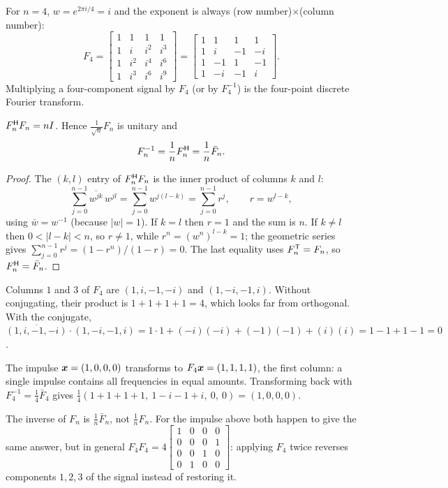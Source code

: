 For $n=4$, $w=e^{2\pi i/4}=i$ and the exponent is always (row number)$\times$(column number):
\[
  F_4=\begin{bmatrix}1&1&1&1\\1&i&i^2&i^3\\1&i^2&i^4&i^6\\1&i^3&i^6&i^9\end{bmatrix}
     =\begin{bmatrix}1&1&1&1\\1&i&-1&-i\\1&-1&1&-1\\1&-i&-1&i\end{bmatrix}.
\]
Multiplying a four-component signal by $F_4$ (or by $F_4^{-1}$) is the four-point discrete Fourier
transform.

\begin{theorem}\label{thm:u30-orth}
$F_n^{\mathsf{H}} F_n=nI$. Hence $\frac{1}{\sqrt n}F_n$ is unitary and
\[
  F_n^{-1}=\frac1n F_n^{\mathsf{H}}=\frac1n\bar F_n .
\]
\end{theorem}
\begin{proof}
The $(k,l)$ entry of $F_n^{\mathsf{H}} F_n$ is the inner product of columns $k$ and $l$:
\[
  \sum_{j=0}^{n-1}\overline{w^{jk}}\,w^{jl}=\sum_{j=0}^{n-1}w^{j(l-k)}=\sum_{j=0}^{n-1}r^j,
  \qquad r=w^{l-k},
\]
using $\bar w=w^{-1}$ (because $|w|=1$). If $k=l$ then $r=1$ and the sum is $n$. If $k\ne l$
then $0<|l-k|<n$, so $r\ne1$, while $r^n=(w^n)^{l-k}=1$; the geometric series gives
$\sum_{j=0}^{n-1}r^j=(1-r^n)/(1-r)=0$. The last equality uses $F_n^{\mathsf{T}}=F_n$, so
$F_n^{\mathsf{H}}=\bar F_n$.
\end{proof}

\begin{example}\label{ex:u30-f4}
Columns $1$ and $3$ of $F_4$ are $(1,i,-1,-i)$ and $(1,-i,-1,i)$. Without conjugating, their
product is $1+1+1+1=4$, which looks far from orthogonal. With the conjugate,
$\overline{(1,i,-1,-i)}\cdot(1,-i,-1,i)=1\cdot1+(-i)(-i)+(-1)(-1)+(i)(i)=1-1+1-1=0$.

The impulse $\boldsymbol{x}=(1,0,0,0)$ transforms to $F_4\boldsymbol{x}=(1,1,1,1)$, the first column: a single
impulse contains all frequencies in equal amounts. Transforming back with
$F_4^{-1}=\tfrac14\bar F_4$ gives $\tfrac14(1+1+1+1,\ 1-i-1+i,\ 0,\ 0)=(1,0,0,0)$.
\end{example}

\begin{trap}
The inverse of $F_n$ is $\frac1n\bar F_n$, not $\frac1nF_n$. For the impulse above both happen to
give the same answer, but in general $F_4F_4=4\left[\begin{smallmatrix}1&0&0&0\\0&0&0&1\\0&0&1&0\\0&1&0&0\end{smallmatrix}\right]$:
applying $F_4$ twice reverses components $1,2,3$ of the signal instead of restoring it.
\end{trap}

